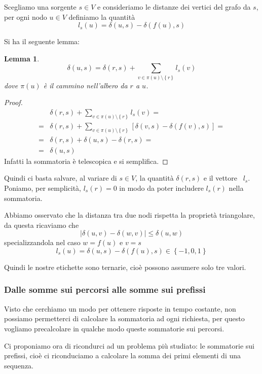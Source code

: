 \documentclass[a4paper,10pt]{amsbook}
\newcounter{counter1}
\theoremstyle{plain}
\newtheorem{mylem}[counter1]{Lemma}
\theoremstyle{definition}
\theoremstyle{remark}
\newcommand{\set}[1]{\left\{#1\right\}}
\newcommand{\pa}[1]{\left(#1\right)}
\newcommand{\bra}[1]{\left[#1\right]}
\newcommand{\abs}[1]{\left|#1\right|}
\begin{document}
Scegliamo una sorgente $s\in V$ e consideriamo le distanze dei vertici
del grafo da $s$, per ogni nodo $u\in V$ definiamo la quantit\`a
\[ l_s (u) = \delta\pa{ u,s } - \delta\pa{ f(u),s} \]

Si ha il seguente lemma:
\begin{mylem}
  \[ \delta\pa{ u,s} = \delta\pa{ r,s} + \sum _{v\in \pi (u)\setminus
    \set{r}} l_s(v) \] dove $\pi (u)$ \`e il cammino nell'albero da
  $r$ a $u$.
\end{mylem}
\begin{proof}
  \begin{align*}
    &\delta\pa{ r,s} + \sum _{v\in \pi (u)\setminus \set{r}} l_s(v) =\\
    =& \delta\pa{ r,s} + \sum _{v\in \pi (u)\setminus \set{r}} \bra{
      \delta\pa{ v,s } - \delta\pa{ f(v),s} } =\\
    = & \delta\pa{ r,s} + \delta\pa{ u,s} - \delta\pa{ r,s}=\\
    = & \delta\pa{ u,s}
  \end{align*}
  Infatti la sommatoria \`e telescopica e si semplifica.
\end{proof}

Quindi ci basta salvare, al variare di $s\in V$, la quantit\`a
$\delta\pa{ r,s}$ e il vettore~ $l_s$. Poniamo, per semplicit\`a,
$l_s(r) = 0$ in modo da poter includere $l_s(r)$ nella sommatoria.

Abbiamo osservato che la distanza tra due nodi rispetta la propriet\`a
triangolare, da questa ricaviamo che 
\[ \abs { \delta\pa{ u,v} - \delta\pa{ w,v}} \le \delta\pa{ u,w} \]
specializzandola nel caso $w = f(u)$ e $v = s$
\[ l_s (u) = \delta\pa{ u,s} - \delta\pa{ f(u),s} \in \set{ -1, 0 ,
  1} \]

Quindi le nostre etichette sono ternarie, cio\`e possono assumere solo
tre valori.

\subsubsection{Dalle somme sui percorsi alle somme sui prefissi}

Visto che cerchiamo un modo per ottenere risposte in tempo costante,
non possiamo permetterci di calcolare la sommatoria ad ogni richiesta,
per questo vogliamo precalcolare in qualche modo queste sommatorie sui
percorsi.

Ci proponiamo ora di ricondurci ad un problema pi\`u studiato: le
sommatorie sui prefissi, cio\`e ci riconduciamo a calcolare la somma
dei primi elementi di una sequenza.
\end{document}
